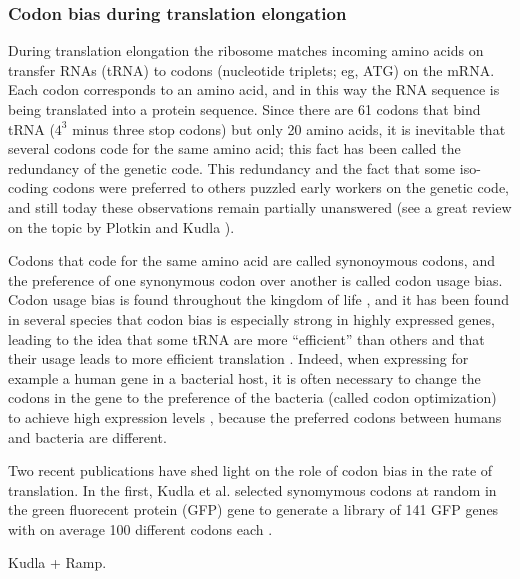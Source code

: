 \subsubsection{Codon bias during translation elongation}
During translation elongation the ribosome matches incoming amino acids on
transfer RNAs (tRNA) to codons (nucleotide triplets; eg, ATG) on the mRNA. Each
codon corresponds to an amino acid, and in this way the RNA sequence is being
translated into a protein sequence. Since there are 61 codons that bind tRNA
($4^3$ minus three stop codons) but only 20 amino acids, it is inevitable that
several codons code for the same amino acid; this fact has been called the
redundancy of the genetic code. This redundancy and the fact that some
iso-coding codons were preferred to others puzzled early workers on the
genetic code, and still today these observations remain partially unanswered
(see a great review on the topic by Plotkin and Kudla \cite{plotkin_synonymous_2011}).

Codons that code for the same amino acid are called synonoymous codons, and the
preference of one synonymous codon over another is called codon usage bias.
Codon usage bias is found throughout the kingdom of life
\cite{sharp_codon_1988}, and it has been found in several species that codon
bias is especially strong in highly expressed genes, leading to the idea that
some tRNA are more ``efficient'' than others and that their usage leads to more
efficient translation \cite{moriyama_gene_1998}. Indeed, when expressing for
example a human gene in a bacterial host, it is often necessary to change the
codons in the gene to the preference of the bacteria (called codon
optimization) to achieve high expression levels \cite{gustafsson_codon_2004},
because the preferred codons between humans and bacteria are different.

Two recent publications have shed light on the role of codon bias in the rate
of translation. In the first, Kudla et al. selected synomymous codons at random
in the green fluorecent protein (GFP) gene to generate a library of 141 GFP
genes with on average 100 different codons each
\cite{kudla_coding-sequence_2009}.


Kudla + Ramp.
